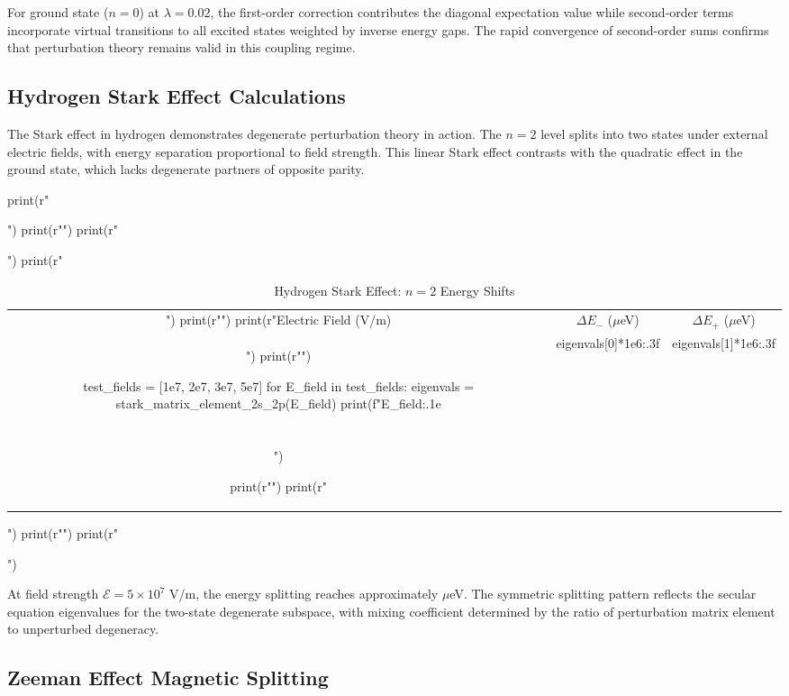 \documentclass[a4paper, 11pt]{article}
\begin{document}
For ground state ($n=0$) at $\lambda = 0.02$, the first-order correction
contributes the diagonal expectation value while second-order terms incorporate
virtual transitions to all excited states weighted by inverse energy gaps. The
rapid convergence of second-order sums confirms that perturbation theory remains
valid in this coupling regime.

\subsection{Hydrogen Stark Effect Calculations}

The Stark effect in hydrogen demonstrates degenerate perturbation theory in
action. The $n=2$ level splits into two states under external electric fields,
with energy separation proportional to field strength. This linear Stark
effect contrasts with the quadratic effect in the ground state, which lacks
degenerate partners of opposite parity.

\begin{pycode}
print(r"\begin{table}[htbp]")
print(r"\centering")
print(r"\caption{Hydrogen Stark Effect: $n=2$ Energy Shifts}")
print(r"\begin{tabular}{ccc}")
print(r"\toprule")
print(r"Electric Field (V/m) & $\Delta E_-$ ($\mu$eV) & $\Delta E_+$ ($\mu$eV) \\")
print(r"\midrule")

test_fields = [1e7, 2e7, 3e7, 5e7]
for E_field in test_fields:
    eigenvals = stark_matrix_element_2s_2p(E_field)
    print(f"{E_field:.1e} & {eigenvals[0]*1e6:.3f} & {eigenvals[1]*1e6:.3f} \\\\")

print(r"\bottomrule")
print(r"\end{tabular}")
print(r"\label{tab:stark}")
print(r"\end{table}")
\end{pycode}

At field strength $\mathcal{E} = 5 \times 10^7$ V/m, the energy splitting
reaches approximately  $\mu$eV. The symmetric
splitting pattern reflects the secular equation eigenvalues for the two-state
degenerate subspace, with mixing coefficient determined by the ratio of
perturbation matrix element to unperturbed degeneracy.

\subsection{Zeeman Effect Magnetic Splitting}
\end{document}
